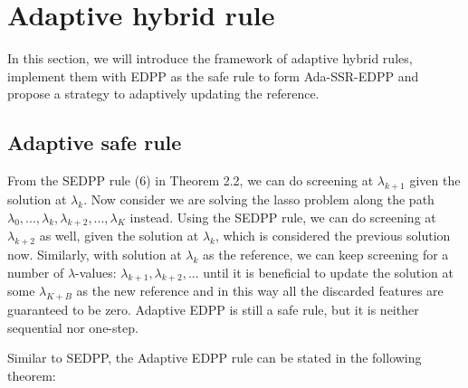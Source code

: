 \section{Adaptive hybrid rule}
\label{sec:method}

In this section, we will introduce the framework of adaptive hybrid rules, implement them with EDPP as the safe rule to form Ada-SSR-EDPP and propose a strategy to adaptively updating the reference.

\subsection{Adaptive safe rule}

From the SEDPP rule (6) in Theorem 2.2, we can do screening at $\lambda_{k+1}$ given the solution at $\lambda_k$. Now consider we are solving the lasso problem along the path $\lambda_0,...,\lambda_k,\lambda_{k+2},...,\lambda_K$ instead. Using the SEDPP rule, we can do screening at $\lambda_{k+2}$ as well, given the solution at $\lambda_k$, which is considered the previous solution now. Similarly, with solution at $\lambda_k$ as the reference, we can keep screening for a number of $\lambda$-values: $\lambda_{k+1},\lambda_{k+2},...$ until it is beneficial to update the solution at some $\lambda_{K+B}$ as the new reference and in this way all the discarded features are guaranteed to be zero. Adaptive EDPP is still a safe rule, but it is neither sequential nor one-step.

Similar to SEDPP, the Adaptive EDPP rule can be stated in the following theorem:


